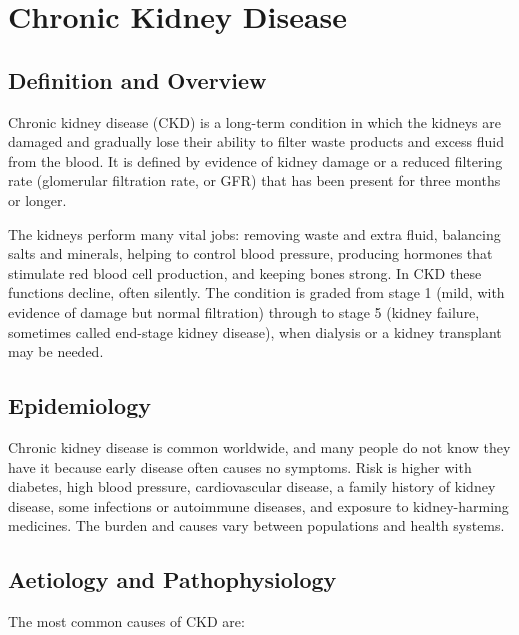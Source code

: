 \chapter{Chronic Kidney Disease}

\section*{Definition and Overview}
Chronic kidney disease (CKD) is a long-term condition in which the kidneys are damaged and gradually lose their ability to filter waste products and excess fluid from the blood. It is defined by evidence of kidney damage or a reduced filtering rate (glomerular filtration rate, or GFR) that has been present for three months or longer.

The kidneys perform many vital jobs: removing waste and extra fluid, balancing salts and minerals, helping to control blood pressure, producing hormones that stimulate red blood cell production, and keeping bones strong. In CKD these functions decline, often silently. The condition is graded from stage 1 (mild, with evidence of damage but normal filtration) through to stage 5 (kidney failure, sometimes called end-stage kidney disease), when dialysis or a kidney transplant may be needed.

\section*{Epidemiology}
Chronic kidney disease is common worldwide, and many people do not know they have it because early disease often causes no symptoms. Risk is higher with diabetes, high blood pressure, cardiovascular disease, a family history of kidney disease, some infections or autoimmune diseases, and exposure to kidney-harming medicines. The burden and causes vary between populations and health systems.

\section*{Aetiology and Pathophysiology}
The most common causes of CKD are:

